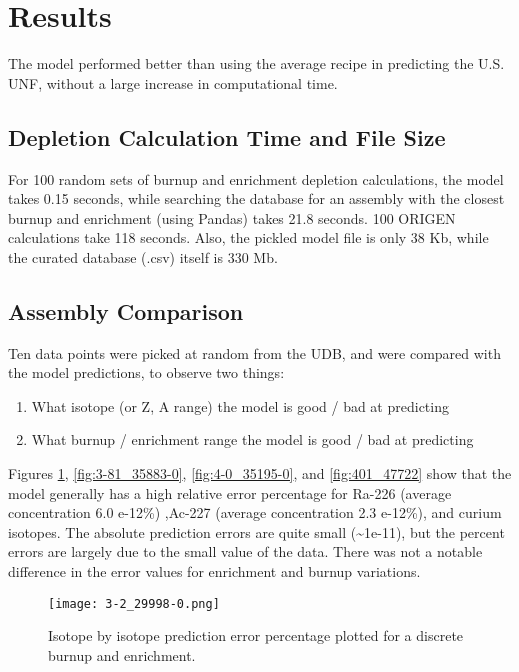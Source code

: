 \section{Results}

The model performed better than using the average
recipe in predicting the U.S. \gls{UNF}, without
a large increase in computational time.


\subsection{Depletion Calculation Time and File Size}

For 100 random sets of
burnup and enrichment depletion calculations,
the model takes 0.15 seconds, while
searching the database for an assembly
with the closest burnup and enrichment (using Pandas)
takes 21.8 seconds. 100 \gls{ORIGEN} calculations
take 118 seconds. Also, the pickled model file is only
38 Kb, while the curated database (.csv) itself is 330 Mb.

\subsection{Assembly Comparison}

Ten data points were picked at random from the \gls{UDB},
and were compared with the model predictions, to observe
two things:
\begin{enumerate}
    \item What isotope (or Z, A range) the model is good / bad
        at predicting
    \item What burnup / enrichment range the model is good / bad
        at predicting
\end{enumerate}

Figures \ref{fig:3-2_29998-0}, \ref{fig:3-81_35883-0},
\ref{fig:4-0_35195-0}, and \ref{fig:401_47722}
show that the model
generally has a high relative error percentage for Ra-226
(average concentration 6.0 e-12\%) ,Ac-227 (average concentration  2.3 e-12\%), and curium isotopes.
The absolute prediction errors are quite small
(\textasciitilde 1e-11), but the percent errors are largely due
to the small value of the data. There was not a notable
difference in the error values for enrichment
and burnup variations.

\begin{figure}
    \centering
    \texttt{[image: 3-2\_29998-0.png]}
    \caption{Isotope by isotope prediction error percentage
             plotted for a discrete burnup and enrichment.}
    \label{fig:3-2_29998-0}
\end{figure}


